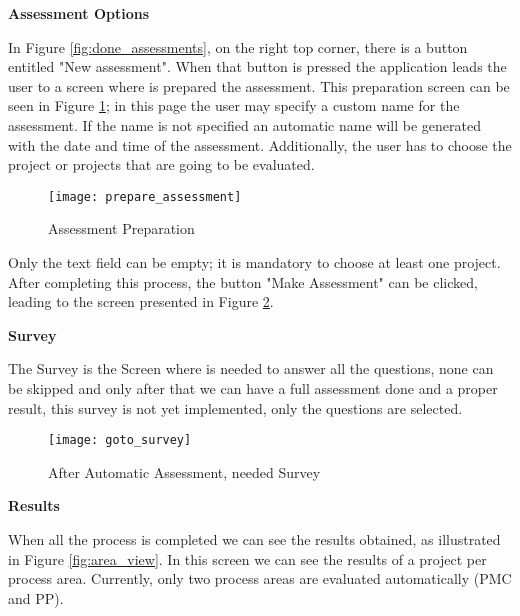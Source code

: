 \vspace{10 mm}

\textbf{Assessment Options}

In Figure \ref{fig:done_assessments}, on the right top corner, there is a button entitled "New assessment". When that button is pressed the application leads the user to a screen where is prepared the assessment. This preparation screen can be seen in Figure \ref{fig:prepare_assessment}; in this page the user may specify a custom name for the assessment. If the name is not specified an automatic name will be generated with the date and time of the assessment. Additionally, the user has to choose the project or projects that are going to be evaluated.

\begin{figure}[!htb]
	\begin{center}
		\leavevmode
		\texttt{[image: prepare\_assessment]}
		\caption{Assessment Preparation}
		\label{fig:prepare_assessment}
	\end{center}
\end{figure}

Only the text field can be empty; it is mandatory to choose at least one project. After completing this process, the button "Make Assessment" can be clicked, leading to the screen presented in Figure \ref{fig:goto_survey}.

\vspace{10 mm}
\newpage
\textbf{Survey}

The Survey is the Screen where is needed to answer all the questions, none can be skipped and only after that we can have a full assessment done and a proper result, this survey is not yet implemented, only the questions are selected.

\begin{figure}[!htb]
	\begin{center}
		\leavevmode
		\texttt{[image: goto\_survey]}
		\caption{After Automatic Assessment, needed Survey}
		\label{fig:goto_survey}
	\end{center}
\end{figure}

\vspace{10 mm}

\newpage
\textbf{Results}

When all the process is completed we can see the results obtained, as illustrated in Figure \ref{fig:area_view}. In this screen we can see the results of a project per process area. Currently, only two process areas are evaluated automatically (PMC and PP).

